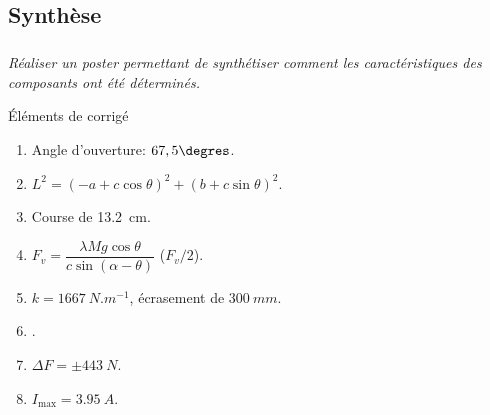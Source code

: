 \documentclass[10pt,fleqn]{article} %
\begin{document}
\begin{multicols}{2}
\begin{multicols}{2}
\subsection*{Synthèse}
\subparagraph{}
\textit{Réaliser un poster permettant de synthétiser comment les caractéristiques des composants ont été déterminés.}
%
\ifprof
\else
\footnotesize

\begin{multicols}{2}
\noindent Éléments de corrigé 
\begin{enumerate}
\item Angle d'ouverture: $67,5\degres$.
\item $L^2 =\left(-a + c\cos\theta \right)^2 + \left(b + c\sin\theta \right)^2  $.
\item Course de \SI{13,2}{cm}.
\item $   F_v = \dfrac{\lambda Mg\cos \theta}{c\sin \left( \alpha - \theta\right)} $ ($F_v/2$).
\item $k=\SI{1667}{N.m^{-1}}$, écrasement de $\SI{300}{mm}$.
\item .
\item $\Delta F = \pm \SI{443}{N}$.
\item $I_{\text{max}} = \SI{3,95}{A}$.
\end{enumerate}
\end{multicols}
\fi

\normalsize


\ifprof
\end{multicols}
\else
\end{multicols}
\fi
\end{document}

